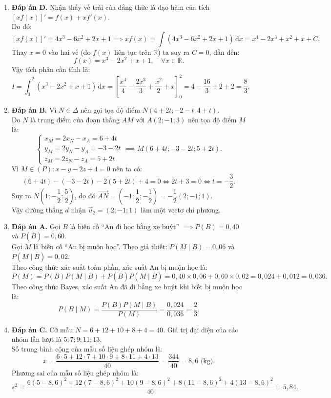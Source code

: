 \documentclass[12pt,a4paper]{article}
\begin{document}
\begin{enumerate}[label=\textbf{Câu \arabic*:}, leftmargin=*]
\item \textbf{Đáp án D.}
Nhận thấy vế trái của đẳng thức là đạo hàm của tích $[x f(x)]' = f(x) + x f'(x)$.\\
Do đó:
$$[x f(x)]' = 4x^3 - 6x^2 + 2x + 1 \implies x f(x) = \int (4x^3 - 6x^2 + 2x + 1)\,\mathrm{d}x = x^4 - 2x^3 + x^2 + x + C.$$
Thay $x = 0$ vào hai vế (do $f(x)$ liên tục trên $\mathbb{R}$) ta suy ra $C = 0$, dẫn đến:
$$f(x) = x^3 - 2x^2 + x + 1, \quad \forall x \in \mathbb{R}.$$
Vậy tích phân cần tính là:
$$I = \int_0^2 (x^3 - 2x^2 + x + 1)\,\mathrm{d}x = \left[ \dfrac{x^4}{4} - \dfrac{2x^3}{3} + \dfrac{x^2}{2} + x \right]_0^2 = 4 - \dfrac{16}{3} + 2 + 2 = \dfrac{8}{3}.$$

\item \textbf{Đáp án B.}
Vì $N \in \Delta$ nên gọi tọa độ điểm $N(4 + 2t; -2 - t; 4 + t)$.\\
Do $N$ là trung điểm của đoạn thẳng $AM$ với $A(2; -1; 3)$ nên tọa độ điểm $M$ là:
$$\begin{cases} x_M = 2x_N - x_A = 6 + 4t \\ y_M = 2y_N - y_A = -3 - 2t \\ z_M = 2z_N - z_A = 5 + 2t \end{cases} \implies M(6 + 4t; -3 - 2t; 5 + 2t).$$
Vì $M \in (P): x - y - 2z + 4 = 0$ nên ta có:
$$(6 + 4t) - (-3 - 2t) - 2(5 + 2t) + 4 = 0 \iff 2t + 3 = 0 \iff t = -\dfrac{3}{2}.$$
Suy ra $N\left(1; -\dfrac{1}{2}; \dfrac{5}{2}\right)$, do đó $\overrightarrow{AN} = \left(-1; \dfrac{1}{2}; -\dfrac{1}{2}\right) = -\dfrac{1}{2}(2; -1; 1)$.\\
Vậy đường thẳng $d$ nhận $\vec{u}_2 = (2; -1; 1)$ làm một vectơ chỉ phương.

\item \textbf{Đáp án A.}
Gọi $B$ là biến cố ``An đi học bằng xe buýt'' $\implies P(B) = 0{,}40$ và $P(\overline{B}) = 0{,}60$.\\
Gọi $M$ là biến cố ``An bị muộn học''. Theo giả thiết: $P(M \mid B) = 0{,}06$ và $P(M \mid \overline{B}) = 0{,}02$.\\
Theo công thức xác suất toàn phần, xác suất An bị muộn học là:
$$P(M) = P(B)P(M \mid B) + P(\overline{B})P(M \mid \overline{B}) = 0{,}40 \times 0{,}06 + 0{,}60 \times 0{,}02 = 0{,}024 + 0{,}012 = 0{,}036.$$
Theo công thức Bayes, xác suất An đã đi bằng xe buýt khi biết bị muộn học là:
$$P(B \mid M) = \dfrac{P(B)P(M \mid B)}{P(M)} = \dfrac{0{,}024}{0{,}036} = \dfrac{2}{3}.$$

\item \textbf{Đáp án C.}
Cỡ mẫu $N = 6 + 12 + 10 + 8 + 4 = 40$. Giá trị đại diện của các nhóm lần lượt là $5; 7; 9; 11; 13$.\\
Số trung bình cộng của mẫu số liệu ghép nhóm là:
$$\bar{x} = \dfrac{6 \cdot 5 + 12 \cdot 7 + 10 \cdot 9 + 8 \cdot 11 + 4 \cdot 13}{40} = \dfrac{344}{40} = 8{,}6\text{ (kg)}.$$
Phương sai của mẫu số liệu ghép nhóm là:
$$s^2 = \dfrac{6(5 - 8{,}6)^2 + 12(7 - 8{,}6)^2 + 10(9 - 8{,}6)^2 + 8(11 - 8{,}6)^2 + 4(13 - 8{,}6)^2}{40} = 5{,}84.$$


\end{enumerate}
\end{document}
